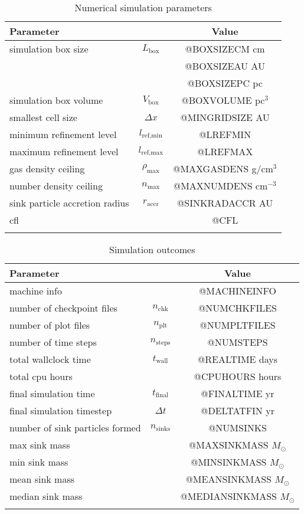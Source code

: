 \documentclass[letterpaper,11pt]{article}
\newcommand{\Msun}{M_\odot}
\begin{document}
\begin{table*}
\centering
\caption{Numerical simulation parameters}
\begin{tabular*}{0.8\textwidth}{@{\extracolsep{\fill} } lcc}
\hline
Parameter & & Value \\
\hline
simulation box size      & $L_{\textrm{box}}$ & @BOXSIZECM   cm \\
                         &                    & @BOXSIZEAU   AU \\
                         &                    & @BOXSIZEPC   pc \\
simulation box volume  & $V_{\textrm{box}}$ & @BOXVOLUME  pc$^3$\\
smallest cell size & $\Delta x$ & @MINGRIDSIZE  AU \\
minimum refinement level & $l_{\textrm{ref,min}}$ & @LREFMIN \\
maximum refinement level & $l_{\textrm{ref,max}}$ & @LREFMAX \\
gas density ceiling& $\rho_{\textrm{max}}$ & @MAXGASDENS g/cm$^3$\\
number density ceiling& $n_{\textrm{max}}$ & @MAXNUMDENS cm$^{-3}$\\
sink particle accretion radius & $r_{\textrm{accr}}$ & @SINKRADACCR AU \\
cfl & & @CFL \\
\hline \\
\end{tabular*}
\end{table*}


\begin{table*}
\centering
\caption{Simulation outcomes}
\begin{tabular*}{0.95\textwidth}{@{\extracolsep{\fill} } lcc}
\hline
Parameter & & Value \\
\hline
machine info & & @MACHINEINFO \\
number of checkpoint files & $n_{\textrm{chk}}$ & @NUMCHKFILES \\
number of plot files & $n_{\textrm{plt}}$ & @NUMPLTFILES \\
number of time steps & $n_{\textrm{steps}}$ & @NUMSTEPS \\
total wallclock time & $t_{\textrm{wall}}$ & @REALTIME days \\
total cpu hours & & @CPUHOURS hours \\
final simulation time & $t_{\textrm{final}}$ & @FINALTIME yr \\
final simulation timestep & $\Delta t$ & @DELTATFIN yr \\
number of sink particles formed & $n_{\textrm{sinks}}$ & @NUMSINKS \\
max sink mass & & @MAXSINKMASS $\Msun$ \\
min sink mass & & @MINSINKMASS $\Msun$ \\
mean sink mass & & @MEANSINKMASS $\Msun$ \\
median sink mass & & @MEDIANSINKMASS $\Msun$ \\
\hline \\
\end{tabular*}
\end{table*}
\end{document}
